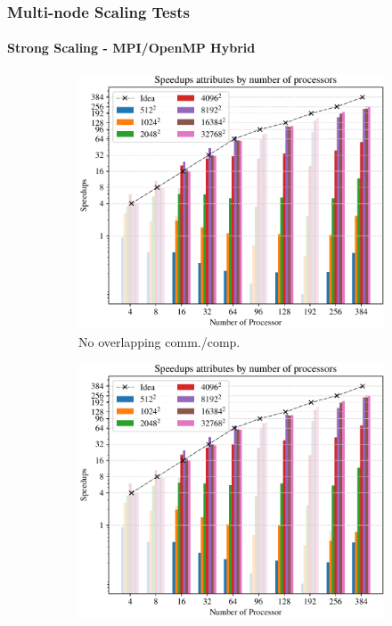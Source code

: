 \begin{frame}
  \frametitle{Multi-node Scaling Tests}
  \framesubtitle{Strong Scaling - MPI/OpenMP Hybrid}
  \begin{figure}
    \centering
    \begin{subfigure}{0.47\textwidth}
      \centering
      \includegraphics[width=\textwidth]{figure/FIG_Benchmark_hybrid_0_multi_nodes.pdf}
      \caption{No overlapping comm./comp.}
      \label{FIG:Benchmark:Hybrid_0_Multi_Node}
    \end{subfigure}
    \begin{subfigure}{0.47\textwidth}
      \centering
      \includegraphics[width=\textwidth]{figure/FIG_Benchmark_hybrid_1_multi_nodes.pdf}

\end{subfigure}
\end{figure}
\end{frame}
